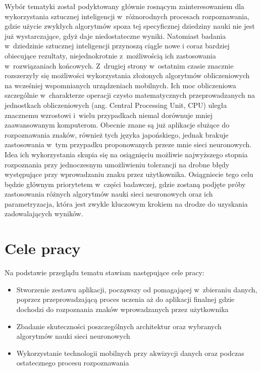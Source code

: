 Wybór tematyki został podyktowany głównie rosnącym zainteresowaniem dla wykorzystania sztucznej inteligencji w~różnorodnych procesach rozpoznawania, gdzie użycie zwykłych algorytmów spoza tej specyficznej dziedziny nauki nie jest już wystarczające, gdyż daje niedostateczne wyniki. Natomiast badania w~dziedzinie sztucznej inteligencji przynoszą ciągle nowe i coraz bardziej obiecujące rezultaty, niejednokrotnie z~możliwością ich zastosowania w~rozwiązaniach końcowych. Z~drugiej strony w~ostatnim czasie znacznie rozszerzyły się możliwości wykorzystania złożonych algorytmów obliczeniowych na wcześniej wspomnianych urządzeniach mobilnych. Ich moc obliczeniowa szczególnie w~charakterze operacji czysto matematycznych przeprowadzanych na jednostkach obliczeniowych (ang. Central Processing Unit, CPU) uległa znacznemu wzrostowi i~wielu przypadkach niemal dorównuje mniej zaawansowanym komputerom.
Obecnie znane są już aplikacje służące do rozpoznawania znaków, również tych języka japońskiego, jednak brakuje zastosowania w~tym przypadku proponowanych przeze mnie sieci neuronowych. Idea ich wykorzystania skupia się na osiągnięciu możliwie najwyższego stopnia rozpoznania przy jednoczesnym umożliwieniu tolerancji na drobne błędy występujące przy wprowadzaniu znaku przez użytkownika. Osiągniecie tego celu będzie głównym priorytetem w~części badawczej, gdzie zostaną podjęte próby zastosowania różnych algorytmów nauki sieci neuronowych oraz ich parametryzacja, która jest zwykle kluczowym krokiem na drodze do uzyskania zadowalających wyników. 


\section{Cele pracy}\label{sec:cele_pracy}
Na podstawie przeglądu tematu stawiam następujące cele pracy:

\begin{itemize}
 \item Stworzenie zestawu aplikacji, począwszy od pomagającej w~zbieraniu danych, poprzez przeprowadzającą proces uczenia aż do aplikacji finalnej gdzie dochodzi do rozpoznania znaków wprowadzanych przez użytkownika
 \item Zbadanie skuteczności poszczególnych architektur oraz wybranych algorytmów nauki sieci neuronowych
 \item Wykorzystanie technologii mobilnych przy akwizycji danych oraz podczas ostatecznego procesu rozpoznawania
\end{itemize}


